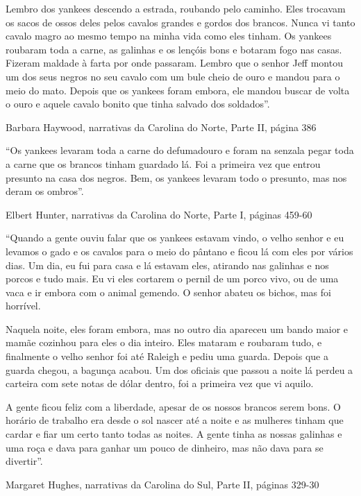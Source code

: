 Lembro dos yankees descendo a estrada, roubando pelo caminho. Eles
trocavam os sacos de ossos deles pelos cavalos grandes e gordos dos
brancos. Nunca vi tanto cavalo magro ao mesmo tempo na minha vida como
eles tinham. Os yankees roubaram toda a carne, as galinhas e os lençóis
bons e botaram fogo nas casas. Fizeram maldade à farta por onde
passaram. Lembro que o senhor Jeff montou um dos seus negros no seu
cavalo com um bule cheio de ouro e mandou para o meio do mato. Depois
que os yankees foram embora, ele mandou buscar de volta o ouro e aquele
cavalo bonito que tinha salvado dos soldados''.

Barbara Haywood, narrativas da Carolina do Norte, Parte II, página 386

``Os yankees levaram toda a carne do defumadouro e foram na senzala
pegar toda a carne que os brancos tinham guardado lá. Foi a primeira vez
que entrou presunto na casa dos negros. Bem, os yankees levaram todo o
presunto, mas nos deram os ombros''.

Elbert Hunter, narrativas da Carolina do Norte, Parte I, páginas 459-60

``Quando a gente ouviu falar que os yankees estavam vindo, o velho
senhor e eu levamos o gado e os cavalos para o meio do pântano e ficou
lá com eles por vários dias. Um dia, eu fui para casa e lá estavam eles,
atirando nas galinhas e nos porcos e tudo mais. Eu vi eles cortarem o
pernil de um porco vivo, ou de uma vaca e ir embora com o animal
gemendo. O senhor abateu os bichos, mas foi horrível.

Naquela noite, eles foram embora, mas no outro dia apareceu um bando
maior e mamãe cozinhou para eles o dia inteiro. Eles mataram e roubaram
tudo, e finalmente o velho senhor foi até Raleigh e pediu uma guarda.
Depois que a guarda chegou, a bagunça acabou. Um dos oficiais que passou
a noite lá perdeu a carteira com sete notas de dólar dentro, foi a
primeira vez que vi aquilo.

A gente ficou feliz com a liberdade, apesar de os nossos brancos serem
bons. O horário de trabalho era desde o sol nascer até a noite e as
mulheres tinham que cardar e fiar um certo tanto todas as noites. A
gente tinha as nossas galinhas e uma roça e dava para ganhar um pouco de
dinheiro, mas não dava para se divertir''.

Margaret Hughes, narrativas da Carolina do Sul, Parte II, páginas 329-30

